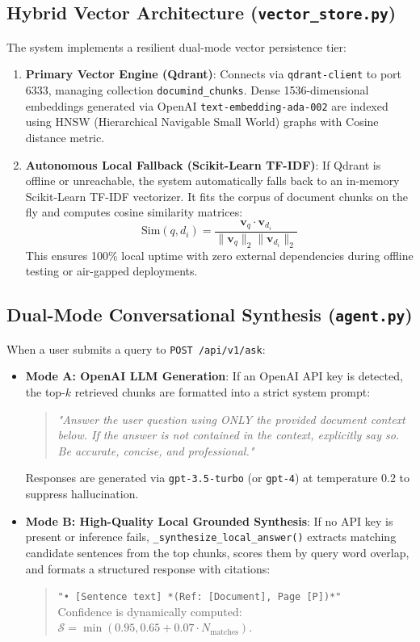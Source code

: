 \documentclass[11pt,a4paper]{article}
\begin{document}
\subsection{Hybrid Vector Architecture (\texttt{vector\_store.py})}
The system implements a resilient dual-mode vector persistence tier:
\begin{enumerate}[leftmargin=*]
    \item \textbf{Primary Vector Engine (Qdrant)}: Connects via \texttt{qdrant-client} to port 6333, managing collection \texttt{documind\_chunks}. Dense 1536-dimensional embeddings generated via OpenAI \texttt{text-embedding-ada-002} are indexed using HNSW (Hierarchical Navigable Small World) graphs with Cosine distance metric.
    \item \textbf{Autonomous Local Fallback (Scikit-Learn TF-IDF)}: If Qdrant is offline or unreachable, the system automatically falls back to an in-memory Scikit-Learn TF-IDF vectorizer. It fits the corpus of document chunks on the fly and computes cosine similarity matrices:
    \begin{equation}
    \text{Sim}(q, d_i) = \frac{\mathbf{v}_q \cdot \mathbf{v}_{d_i}}{\|\mathbf{v}_q\|_2 \|\mathbf{v}_{d_i}\|_2}
    \end{equation}
    This ensures 100\% local uptime with zero external dependencies during offline testing or air-gapped deployments.
\end{enumerate}

\subsection{Dual-Mode Conversational Synthesis (\texttt{agent.py})}
When a user submits a query to \texttt{POST /api/v1/ask}:
\begin{itemize}[leftmargin=*]
    \item \textbf{Mode A: OpenAI LLM Generation}: If an OpenAI API key is detected, the top-$k$ retrieved chunks are formatted into a strict system prompt:
    \begin{quote}
    \textit{"Answer the user question using ONLY the provided document context below. If the answer is not contained in the context, explicitly say so. Be accurate, concise, and professional."}
    \end{quote}
    Responses are generated via \texttt{gpt-3.5-turbo} (or \texttt{gpt-4}) at temperature 0.2 to suppress hallucination.
    \item \textbf{Mode B: High-Quality Local Grounded Synthesis}: If no API key is present or inference fails, \texttt{\_synthesize\_local\_answer()} extracts matching candidate sentences from the top chunks, scores them by query word overlap, and formats a structured response with citations:
    \begin{quote}
    \texttt{"• [Sentence text] *(Ref: [Document], Page [P])*"}\\
    Confidence is dynamically computed: $\mathcal{S} = \min(0.95, 0.65 + 0.07 \cdot N_{\text{matches}})$.
    \end{quote}
\end{itemize}
\end{document}
